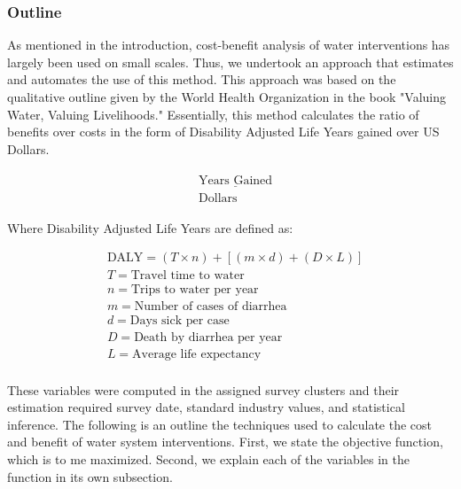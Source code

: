 

\subsubsection*{Outline}
As mentioned in the introduction, cost-benefit analysis of water interventions has largely been used on small scales. 
Thus, we undertook an approach that estimates and automates the use of this method.
This approach was based on the qualitative outline given by the World Health Organization in the book "Valuing Water, Valuing Livelihoods."
Essentially, this method calculates the ratio of benefits over costs in the form of Disability Adjusted Life Years gained over US Dollars.

\begin{equation}
\begin{aligned}
& \begin{matrix} \underline{\text{Years Gained}} \\ \text{Dollars} \end{matrix}
\end{aligned}
\end{equation}

Where Disability Adjusted Life Years are defined as:

\begin{equation}
\begin{aligned}
& \text{DALY} = (T \times n) + [(m \times d) + (D \times L)]\\
& T = \text{Travel time to water}\\
& n = \text{Trips to water per year}\\
& m = \text{Number of cases of diarrhea}\\
& d = \text{Days sick per case}\\
& D = \text{Death by diarrhea per year}\\
& L = \text{Average life expectancy}\\
\end{aligned}
\end{equation}

These variables were computed in the assigned survey clusters and their estimation required survey date, standard industry values, and statistical inference.
The following is an outline the techniques used to calculate the cost and benefit of water system interventions.
First, we state the objective function, which is to me maximized. 
Second, we explain each of the variables in the function in its own subsection.

